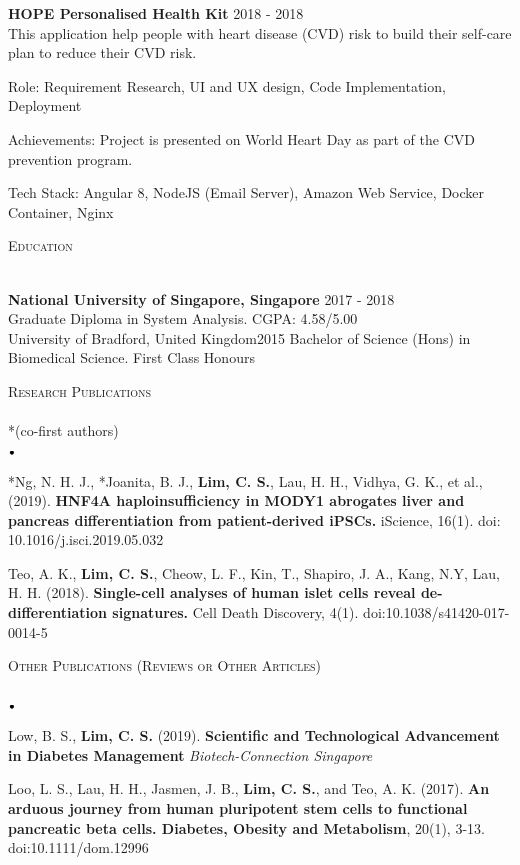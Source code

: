 \documentclass[11pt]{article}
\newcommand{\lineunder}{\vspace*{-8pt} \\ \hspace*{-18pt} \hrulefill \\}
\newcommand{\header}[1]{{\hspace*{-15pt}\vspace*{6pt} \textsc{#1}} \vspace*{-6pt} \lineunder}
\newcommand{\lbt}{\,\begin{picture}(-1,1)(-1,-3)\circle*{3}\end{picture}\ }
\newenvironment{achievements}{
    \begin{list}{$\lbt$}{
        \topsep 0pt
        \itemsep 0pt
        \addtolength{\leftmargin}{-0.1in}
    }
}
{
    \vspace*{4pt}
    \end{list}
}
\newcommand{\schoolwithcourses}[4]{
 \textbf{#1} \hfill{#2}\\
    #3\\
\vspace*{5pt}
}
\begin{document}
\schoolwithcourses{HOPE Personalised Health Kit}{2018 - 2018}
{This application help people with heart disease (CVD) risk to build their self-care plan to reduce their CVD risk.
    
Role: Requirement Research, UI and UX design, Code Implementation, Deployment

Achievements: Project is presented on World Heart Day as part of the CVD prevention program.

Tech Stack: Angular 8, NodeJS (Email Server), Amazon Web Service, Docker Container, Nginx}


\hfill{}

\header{Education}
\vspace{2mm}
\schoolwithcourses{National University of Singapore, Singapore}{2017 - 2018}
{Graduate Diploma in System Analysis. CGPA: 4.58/5.00}

\schoolwithcourses{University of Bradford, United Kingdom}{2015}
{Bachelor of Science (Hons) in Biomedical Science. First Class Honours}
\hfill{}


\header{Research Publications} {*(co-first authors)}
\vspace{2mm}
\begin{achievements}
\justifying
\item {*Ng, N. H. J., *Joanita, B. J., \textbf{Lim, C. S.}, Lau, H. H., Vidhya, G. K., et al., (2019). 
\textbf{HNF4A haploinsufficiency in MODY1 abrogates liver and pancreas differentiation from 
patient-derived iPSCs.} iScience, 16(1). doi: 10.1016/j.isci.2019.05.032}
\item {Teo, A. K., \textbf{Lim, C. S.}, Cheow, L. F., Kin, T., Shapiro, J. A., Kang, N.Y, Lau, H. H. (2018). 
\textbf{Single-cell analyses of human islet cells reveal de-differentiation signatures.} 
Cell Death Discovery, 4(1). doi:10.1038/s41420-017-0014-5}
\end{achievements}
\hfill{}

\header{Other Publications (Reviews or Other Articles)}
\vspace*{2mm}
\begin{achievements}
\justifying
\item Low, B. S., \textbf{Lim, C. S.} (2019). 
\textbf{Scientific and Technological Advancement in Diabetes Management} 
\textit{Biotech-Connection Singapore}
\item {Loo, L. S., Lau, H. H., Jasmen, J. B., \textbf{Lim, C. S.}, and Teo, A. K. (2017). 
\textbf{An arduous journey from human pluripotent stem cells to functional pancreatic beta cells. 
Diabetes, Obesity and Metabolism}, 20(1), 3-13. doi:10.1111/dom.12996}
\end{achievements}
\hfill{}
\end{document}
